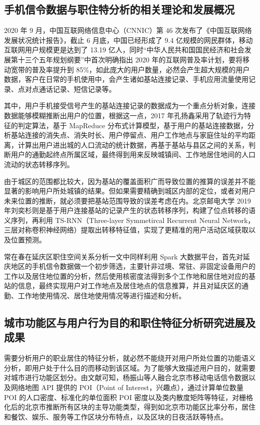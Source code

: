 \subsection{手机信令数据与职住特分析的相关理论和发展概况}

2020 年 9 月，中国互联网络信息中心（CNNIC）第 46 次发布了《中国互联网络发展状况统计报告》\cite{2020_mobile}，截止 6 月底，中国已经形成了 9.4 亿规模的网民群体，移动互联网用户规模更是达到了 13.19 亿人，同时“中华人民共和国国民经济和社会发展第十三个五年规划纲要”中首次明确指出 2020 年的互联网普及率计划，要将移动宽带的普及率提升到 85\%，如此庞大的用户数量，必然会产生超大规模的用户数据，客户在日常的手机使用中，会产生诸如基站连接记录、手机应用流量使用记录、点对点通话记录、短信记录等。

其中，用户手机接受信号产生的基站连接记录的数据成为一个重点分析对象，连接数据能够模糊推断出用户的位置，根据这一点，2017 年孔扬鑫\cite{kong_people}采用了轨迹行为特征的判定算法，基于 MapReduce 分布式计算模型，基于用户的基站连接数据，分析基站连接的消失点、消失时长、用户停留点、用户工作地点与家庭住址的平均距离，计算出用户进出城的人口流动的统计数据，再基于基站与县区之间的关系，判断用户的通勤起终点所属区域，最终得到用来反映城镇间、工作地居住地间的人口流动的状态转移序列。

由于城区的范围都比较大，因为基站的覆盖面积广而导致位置的推算的误差并不能显著的影响用户所处城镇的结果。但如果需要精确到城区内部的定位，或者对用户未来位置的推断，就必须要把基站范围导致的误差考虑在内。北京邮电大学 2019 年刘奕杉\cite{liu_pos_forecast}则是基于用户连接基站的记录产生的状态转移序列，构建了位点转移的语义序列，再利用 TS-RNN（Three-layer Symmetircal Recurrent Neural Network，三层对称卷积神经网络）提取出转移特征值，实现了更精准的用户活动区域获取以及位置预测。

常在春\cite{chang_job_space}在延庆区职住空间关系分析一文中同样利用 Spark 大数据平台，首先对延庆地区的手机信令数据做一个初步筛选，主要针非过境、常驻、非固定设备用户的工作以及居住地位置的分析，然后使用核密度法得到多个工作地和居住地对应的基站的信息，最终实现用户对工作地点及居住地点的信息推算，并且对延庆区的通勤、工作地使用情况、居住地使用情况等进行描述和分析。

\subsection{城市功能区与用户行为目的和职住特征分析研究进展及成果}
\label{sec:city_dist}

需要分析用户的职业居住的特征分析，就必然不能绕开对用户所处位置的功能语义分析，即用户处于什么目的而移动到该区域。为了能够大致描述用户目的，就需要对城市进行功能区划分。由文献\cite{yang_beijing_district}可知，杨振山等人融合北京市移动电话信令数据以及网络地图 API 提供的 POI（Point of Interest，兴趣点），通过计算单位数量 POI 的人口密度、标准化的单位面积 POI 密度以及类内散度矩阵等特征，对栅格化后的北京市推断所有区块的主导功能类型，得到如北京市功能区比率分布，居住和餐饮、娱乐、服务等工作区块分布特点，以及区块的日夜活跃等特点。

